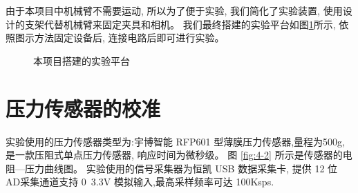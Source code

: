 由于本项目中机械臂不需要运动, 所以为了便于实验, 我们简化了实验装置,
使用设计的支架代替机械臂来固定夹具和相机。
我们最终搭建的实验平台如图\ref{fig:experiment}所示,
依照图示方法固定设备后, 连接电路后即可进行实验。

\begin{figure}[!h]
  \centering
    \hspace{0pt}
  \caption{本项目搭建的实验平台}
  \label{fig:experiment}
  \vspace{-0.3cm}
\end{figure}

\section{压力传感器的校准}
实验使用的压力传感器类型为:宇博智能 RFP601 型薄膜压力传感器,量程为500g,
是一款压阻式单点压力传感器, 响应时间为微秒级。
图 \ref{fig:4-2} 所示是传感器的电阻—压力曲线图。
实验使用的信号采集器为恒凯 USB 数据采集卡,
提供 12 位 AD采集通道支持 0~3.3V 模拟输入,最高采样频率可达 100Ksps.


